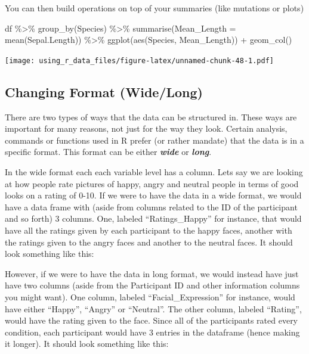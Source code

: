 \documentclass[
]{book}
\newenvironment{Shaded}{\begin{snugshade}}{\end{snugshade}}
\newcommand{\AttributeTok}[1]{\textcolor[rgb]{0.77,0.63,0.00}{#1}}
\newcommand{\FunctionTok}[1]{\textcolor[rgb]{0.00,0.00,0.00}{#1}}
\newcommand{\NormalTok}[1]{#1}
\newcommand{\SpecialCharTok}[1]{\textcolor[rgb]{0.00,0.00,0.00}{#1}}
\begin{document}
You can then build operations on top of your summaries (like mutations or plots)

\begin{Shaded}
\begin{Highlighting}[]
\NormalTok{df }\SpecialCharTok{\%\textgreater{}\%} 
  \FunctionTok{group\_by}\NormalTok{(Species) }\SpecialCharTok{\%\textgreater{}\%} 
  \FunctionTok{summarise}\NormalTok{(}\AttributeTok{Mean\_Length =} \FunctionTok{mean}\NormalTok{(Sepal.Length)) }\SpecialCharTok{\%\textgreater{}\%} 
  \FunctionTok{ggplot}\NormalTok{(}\FunctionTok{aes}\NormalTok{(Species, Mean\_Length)) }\SpecialCharTok{+} 
  \FunctionTok{geom\_col}\NormalTok{()}
\end{Highlighting}
\end{Shaded}

\texttt{[image: using\_r\_data\_files/figure-latex/unnamed-chunk-48-1.pdf]}

\hypertarget{changing-format-widelong}{%
\subsection{Changing Format (Wide/Long)}\label{changing-format-widelong}}

There are two types of ways that the data can be structured in.
These ways are important for many reasons, not just for the way they look.
Certain analysis, commands or functions used in R prefer (or rather mandate) that the data is in a specific format.
This format can be either \textbf{\emph{wide}} or \textbf{\emph{long}}.

In the wide format each each variable level has a column.
Lets say we are looking at how people rate pictures of happy, angry and neutral people in terms of good looks on a rating of 0-10.
If we were to have the data in a wide format, we would have a data frame with (aside from columns related to the ID of the participant and so forth) 3 columns.
One, labeled ``Ratings\_Happy'' for instance, that would have all the ratings given by each participant to the happy faces, another with the ratings given to the angry faces and another to the neutral faces.
It should look something like this:

However, if we were to have the data in long format, we would instead have just have two columns (aside from the Participant ID and other information columns you might want).
One column, labeled ``Facial\_Expression'' for instance, would have either ``Happy'', ``Angry'' or ``Neutral''.
The other column, labeled ``Rating'', would have the rating given to the face.
Since all of the participants rated every condition, each participant would have 3 entries in the dataframe (hence making it longer).
It should look something like this:
\end{document}
